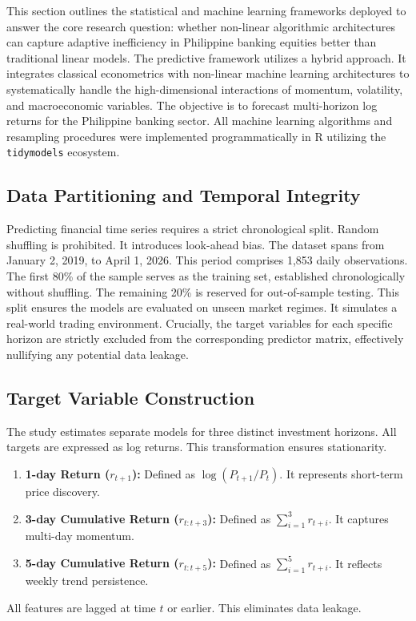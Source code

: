\documentclass[12pt]{article}
\begin{document}
This section outlines the statistical and machine learning frameworks deployed to answer the core research question: whether non-linear algorithmic architectures can capture adaptive inefficiency in Philippine banking equities better than traditional linear models. The predictive framework utilizes a hybrid approach. It integrates classical econometrics with non-linear machine learning architectures to systematically handle the high-dimensional interactions of momentum, volatility, and macroeconomic variables. The objective is to forecast multi-horizon log returns for the Philippine banking sector. All machine learning algorithms and resampling procedures were implemented programmatically in R utilizing the \texttt{tidymodels} ecosystem.

\subsection{Data Partitioning and Temporal Integrity}

Predicting financial time series requires a strict chronological split. Random shuffling is prohibited. It introduces look-ahead bias. The dataset spans from January 2, 2019, to April 1, 2026. This period comprises 1,853 daily observations. The first 80\% of the sample serves as the training set, established chronologically without shuffling. The remaining 20\% is reserved for out-of-sample testing. This split ensures the models are evaluated on unseen market regimes. It simulates a real-world trading environment. Crucially, the target variables for each specific horizon are strictly excluded from the corresponding predictor matrix, effectively nullifying any potential data leakage.

\subsection{Target Variable Construction}

The study estimates separate models for three distinct investment horizons. All targets are expressed as log returns. This transformation ensures stationarity.
\begin{enumerate}
    \item \textbf{1-day Return ($r_{t+1}$):} Defined as $\log(P_{t+1}/P_t)$. It represents short-term price discovery.
    \item \textbf{3-day Cumulative Return ($r_{t:t+3}$):} Defined as $\sum_{i=1}^{3} r_{t+i}$. It captures multi-day momentum.
    \item \textbf{5-day Cumulative Return ($r_{t:t+5}$):} Defined as $\sum_{i=1}^{5} r_{t+i}$. It reflects weekly trend persistence.
\end{enumerate}
All features are lagged at time $t$ or earlier. This eliminates data leakage.
\end{document}
